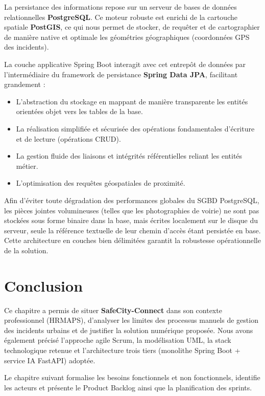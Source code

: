 La persistance des informations repose sur un serveur de bases de données relationnelles \textbf{PostgreSQL}. Ce moteur robuste est enrichi de la cartouche spatiale \textbf{PostGIS}, ce qui nous permet de stocker, de requêter et de cartographier de manière native et optimale les géométries géographiques (coordonnées GPS des incidents).

La couche applicative Spring Boot interagit avec cet entrepôt de données par l'intermédiaire du framework de persistance \textbf{Spring Data JPA}, facilitant grandement :
\begin{itemize}
    \item L'abstraction du stockage en mappant de manière transparente les entités orientées objet vers les tables de la base.
    \item La réalisation simplifiée et sécurisée des opérations fondamentales d'écriture et de lecture (opérations CRUD).
    \item La gestion fluide des liaisons et intégrités référentielles reliant les entités métier.
    \item L'optimisation des requêtes géospatiales de proximité.
\end{itemize}

Afin d'éviter toute dégradation des performances globales du SGBD PostgreSQL, les pièces jointes volumineuses (telles que les photographies de voirie) ne sont pas stockées sous forme binaire dans la base, mais écrites localement sur le disque du serveur, seule la référence textuelle de leur chemin d'accès étant persistée en base. Cette architecture en couches bien délimitées garantit la robustesse opérationnelle de la solution.

\section*{Conclusion}
Ce chapitre a permis de situer \textbf{SafeCity-Connect} dans son contexte professionnel (HRMAPS), d'analyser les limites des processus manuels de gestion des incidents urbains et de justifier la solution numérique proposée. Nous avons également précisé l'approche agile Scrum, la modélisation UML, la stack technologique retenue et l'architecture trois tiers (monolithe Spring Boot + service IA FastAPI) adoptée.

Le chapitre suivant formalise les besoins fonctionnels et non fonctionnels, identifie les acteurs et présente le Product Backlog ainsi que la planification des sprints.
